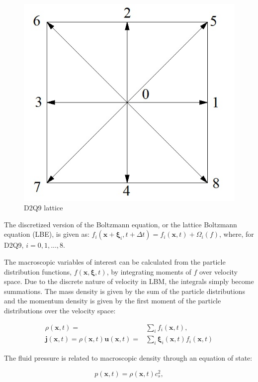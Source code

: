 \documentclass[pdftex,ms]{pittetd}
\newcommand{\pos}{\mathbf{x}}
\newcommand{\pvel}{\boldsymbol{\xi}}
\newcommand{\mvel}{\mathbf{u}}
\newcommand{\mmom}{\mathbf{j}}
\begin{document}
\begin{figure}
  \centering
  \includegraphics[]{figs/d2q9}
  \caption{D2Q9 lattice}
  \label{fig:d2q9}
\end{figure}

The discretized version of the Boltzmann equation, or the lattice Boltzmann equation (LBE), is given as: $f_i(\pos + \pvel_i, t + \Delta t) = f_i(\pos, t) + \Omega_i(f)$, where, for D2Q9, $i = 0, 1, ..., 8$.

The macroscopic variables of interest can be calculated from the particle distribution functions, $f(\pos, \pvel, t)$, by integrating moments of $f$ over velocity space.
Due to the discrete nature of velocity in LBM, the integrals simply become summations.
The mass density is given by the sum of the particle distributions and the momentum density is given by the first moment of the particle distributions over the velocity space:

\begin{align}
\label{eq:rho} \rho(\pos, t) =& \sum_{i} f_i(\pos, t), \\
\label{eq:mom} \mmom(\pos, t) = \rho(\pos, t) \mvel(\pos, t) =& \sum_{i} \pvel_i(\pos, t) f_i(\pos, t)
\end{align}

The fluid pressure is related to macroscopic density through an equation of state:

\begin{equation}
\label{eq:pres} p(\pos, t) = \rho(\pos, t) c_s^2,
\end{equation}
\end{document}
